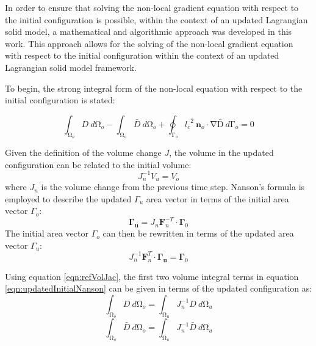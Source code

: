 \documentclass[sn-mathphys,Numbered,draft]{sn-jnl}%
\begin{document}
\begin{appendices}
In order to ensure that solving the non-local gradient equation with respect to the initial configuration is possible, within the context of an updated Lagrangian solid model, a mathematical and algorithmic approach was developed in this work. This approach allows for the solving of the non-local gradient equation with respect to the initial configuration within the context of an updated Lagrangian solid model framework.

To begin, the strong integral form of the non-local equation with respect to the initial configuration is stated:

\begin{equation}
\label{eqn:stronFormNonLocal_URef}
\int_{\mathrm{\Omega}_o}D\ d\mathrm{\Omega}_o-\int_{\mathrm{\Omega}_o}\bar{D}\ d\mathrm{\Omega}_o+\oint_{\mathrm{\Gamma}_o}{{l_c}^2\ \mathbf{n}_o\cdot\mathrm{\nabla}\mathrm{\bar{D}}}\ d\mathrm{\Gamma}_o=0
\end{equation}

Given the definition of the volume change $J$, the volume in the updated configuration can be related to the initial volume:
\begin{equation}
\label{eqn:refVolJac}
    J^{-1}_nV_u=V_o
\end{equation}
where $J_n$ is the volume change from the previous time step.
Nanson's formula is employed to describe the updated $\Gamma_u$ area vector in terms of the initial area vector $\Gamma_o$:
\begin{equation}
    \mathbf{\Gamma_u}=J_n\mathbf{F}_n^{-T}\cdot\mathbf{\Gamma}_0
\end{equation}
The initial area vector $\Gamma_o$ can then be rewritten in terms of the updated area vector $\Gamma_u$:
\begin{equation}
\label{eqn:updatedInitialNanson}
    J^{-1}_n\mathbf{F}_n^{T}\cdot\mathbf{\Gamma_u}=\mathbf{\Gamma}_0
\end{equation}

Using equation \ref{eqn:refVolJac}, the first two volume integral terms in equation \ref{eqn:updatedInitialNanson} can be given in terms of the updated configuration as:
\begin{equation}
\int_{\mathrm{\Omega}_o}D\ d\mathrm{\Omega}_o=\int_{\mathrm{\Omega}_u}J^{-1}_nD\ d\mathrm{\Omega}_u
\end{equation}
\begin{equation}
\int_{\mathrm{\Omega}_o}\bar{D}\ d\mathrm{\Omega}_o=\int_{\mathrm{\Omega}_u}J^{-1}_n\bar{D}\ d\mathrm{\Omega}_u
\end{equation}


\end{appendices}
\end{document}

